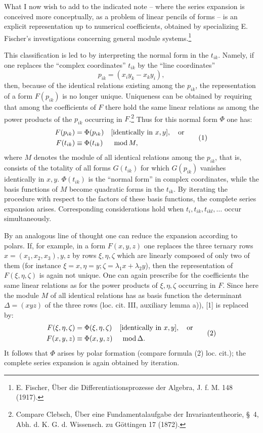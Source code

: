 \documentclass[11pt]{article}
\providecommand{\modu}[1]{\;\operatorname{mod} #1}
\begin{document}
What I now wish to add to the indicated note -- where the series expansion is conceived more conceptually, as a problem of linear pencils of forms -- is an explicit representation up to numerical coefficients, obtained by specializing E. Fischer's investigations concerning general module systems.\footnote{E. Fischer, Über die Differentiationsprozesse der Algebra, J. f. M. 148 (1917).}

This classification is led to by interpreting the normal form in the $t_{ik}$. Namely, if one replaces the ``complex coordinates'' $t_{ik}$ by the ``line coordinates''
\[
        p_{ik}=(x_i y_k-x_k y_i),
\]
then, because of the identical relations existing among the $p_{ik}$, the representation of a form $F(p_{ik})$ is no longer unique. Uniqueness can be obtained by requiring that among the coefficients of $F$ there hold the same linear relations as among the power products of the $p_{ik}$ occurring in $F$.\footnote{Compare Clebsch, Über eine Fundamentalaufgabe der Invariantentheorie, \S~4, Abh. d. K. G. d. Wissensch. zu Göttingen 17 (1872).} Thus for this normal form $\Phi$ one has:
\begin{equation}
\begin{aligned}
        F(p_{ik})&=\Phi(p_{ik}) &&[\text{identically in }x,y],\quad\text{or}\notag\\
        F(t_{ik})&\equiv\Phi(t_{ik}) &&\modu{M},
\end{aligned}
\tag{1}
\end{equation}
where $M$ denotes the module of all identical relations among the $p_{ik}$, that is, consists of the totality of all forms $G(t_{ik})$ for which $G(p_{ik})$ vanishes identically in $x,y$. $\Phi(t_{ik})$ is the ``normal form'' in complex coordinates, while the basis functions of $M$ become quadratic forms in the $t_{ik}$. By iterating the procedure with respect to the factors of these basis functions, the complete series expansion arises. Corresponding considerations hold when $t_i,t_{ik},t_{ikl},\ldots$ occur simultaneously.

By an analogous line of thought one can reduce the expansion according to polars. If, for example, in a form $F(x,y,z)$ one replaces the three ternary rows $x=(x_1,x_2,x_3),y,z$ by rows $\xi,\eta,\zeta$ which are linearly composed of only two of them (for instance $\xi=x,\eta=y;\zeta=\lambda_1x+\lambda_2y$), then the representation of $F(\xi,\eta,\zeta)$ is again not unique. One can again prescribe for the coefficients the same linear relations as for the power products of $\xi,\eta,\zeta$ occurring in $F$. Since here the module $M$ of all identical relations has as basis function the determinant $\Delta=(xyz)$ of the three rows (loc. cit. III, auxiliary lemma a)), [1] is replaced by:
\begin{equation}
\begin{aligned}
        F(\xi,\eta,\zeta)&=\Phi(\xi,\eta,\zeta)&&[\text{identically in }x,y],\quad\text{or}\notag\\
        F(x,y,z)&\equiv\Phi(x,y,z)&&\modu{\Delta}.
\end{aligned}
\tag{2}
\end{equation}
It follows that $\Phi$ arises by polar formation (compare formula (2) loc. cit.); the complete series expansion is again obtained by iteration.
\end{document}
